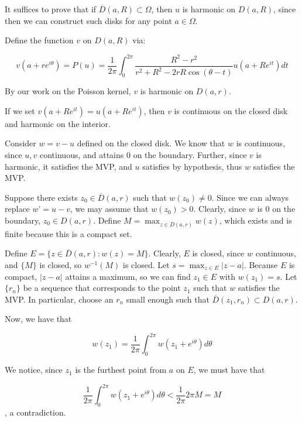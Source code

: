 \documentclass[10pt]{article}
\begin{document}
It suffices to prove that if $\overline{D}(a,R) \subset \Omega$, then $u$ is harmonic on $D(a,R)$, since then we can construct such disks for any point $a \in \Omega$.

Define the function $v$ on $D(a,R)$ via:

$$v(a + re^{i\theta}) = P(u) = \frac{1}{2\pi} \int_0^{2\pi}  \frac{R^2 - r^2}{r^2 + R^2 - 2rR \cos(\theta - t)} u(a + Re^{it}) dt $$

By our work on the Poisson kernel, $v$ is harmonic on $D(a,r)$. 

If we set $v(a + Re^{it}) = u(a + Re^{it})$, then $v$ is continuous on the closed disk and harmonic on the interior.

Consider $w = v - u$ defined on the closed disk. We know that $w$ is continuous, since $u,v$ continuous, and attains $0$ on the boundary. Further, since $v$ is harmonic, it satisfies the MVP, and $u$ satisfies by hypothesis, thus $w$ satisfies the MVP. 

Suppose there exists $z_0 \in \overline{D}(a,r)$ such that $w(z_0) \not = 0$. Since we can always replace $w’ = u - v$, we may assume that $w(z_0) > 0$. Clearly, since $w$ is 0 on the boundary, $z_0 \in D(a,r)$. Define $M = \max_{z \in \overline{D}(a,r)} w(z)$, which exists and is finite because this is a compact set.

Define $E = \{ z \in   \overline{D}(a,r) : w(z) = M \}$. Clearly, $E$ is closed, since $w$ continuous, and $\{ M \}$ is closed, so $w^{-1}(M)$ is closed. Let $s = \max_{z \in E} |z - a| $. Because $E$ is compact, $|z-a|$ attains a maximum, so we can find $z_1 \in E$ with $w(z_1) = s$. Let $\{ r_n \}$ be a sequence that corresponds to the point $z_1$ such that $w$ satisfies the MVP. In particular, choose an $r_n$ small enough such that $\overline{D}(z_1, r_n) \subset D(a,r)$.

Now, we have that 

$$w(z_1) = \frac{1}{2\pi} \int_0^{2\pi} w(z_1 + e^{i\theta}) d\theta $$

We notice, since $z_1$ is the furthest point from $a$ on $E$, we must have that

$$  \frac{1}{2\pi} \int_0^{2\pi} w(z_1 + e^{i\theta}) d\theta  <  \frac{1}{2\pi} 2\pi M = M $$, a contradiction.
\end{document}
